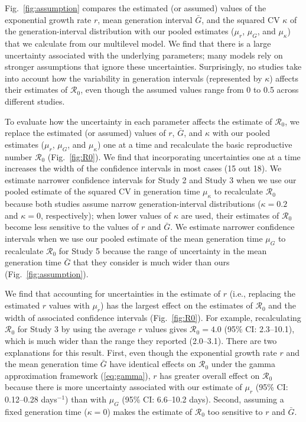 \documentclass[12pt]{article}
\newcommand{\eref}[1]{(\ref{eq:#1})}
\newcommand{\fref}[1]{Fig.~\ref{fig:#1}}
\begin{document}
\fref{assumption} compares the estimated (or assumed) values of the exponential growth rate $r$, mean generation interval $\bar G$, and the squared CV $\kappa$ of the generation-interval distribution with our pooled estimates ($\mu_r$, $\mu_G$, and $\mu_\kappa$) that we calculate from our multilevel model.
We find that there is a large uncertainty associated with the underlying parameters;
many models rely on stronger assumptions that ignore these uncertainties.
Surprisingly, no studies take into account how the variability in generation intervals (represented by $\kappa$) affects their estimates of $\mathcal R_0$, even though the assumed values range from 0 to 0.5 across different studies.

To evaluate how the uncertainty in each parameter affects the estimate of $\mathcal R_0$,
we replace the estimated (or assumed) values of $r$, $\bar G$, and $\kappa$ with our pooled estimates ($\mu_r$, $\mu_G$, and $\mu_\kappa$) one at a time and recalculate the basic reproductive number $\mathcal R_0$ (\fref{R0}).
We find that incorporating uncertainties one at a time increases the width of the confidence intervals in most cases (15 out 18).
We estimate narrower confidence intervals for Study 2 and Study 3 when we use our pooled estimate of the squared CV in generation time $\mu_\kappa$ to recalculate $\mathcal R_0$ because both studies assume narrow generation-interval distributions ($\kappa = 0.2$ and $\kappa=0$, respectively);
when lower values of $\kappa$ are used, their estimates of $\mathcal R_0$ become less sensitive to the values of $r$ and $\bar G$.
We estimate narrower confidence intervals when we use our pooled estimate of the mean generation time $\mu_G$ to recalculate $\mathcal R_0$ for Study 5 because the range of uncertainty in the mean generation time $\bar G$ that they consider is much wider than ours (\fref{assumption}).

We find that accounting for uncertainties in the estimate of $r$ (i.e., replacing the estimated $r$ values with $\mu_r$) has the largest effect on the estimates of $\mathcal R_0$ and the width of associated confidence intervals (\fref{R0}).
For example, recalculating $\mathcal R_0$ for Study 3 by using the average $r$ values gives $\mathcal R_0 = 4.0$ (95\% CI: 2.3--10.1), which is much wider than the range they reported (2.0--3.1).
There are two explanations for this result.
First, even though the exponential growth rate $r$ and the mean generation time $\bar G$ have identical effects on $\mathcal R_0$ under the gamma approximation framework \eref{gamma},
$r$ has greater overall effect on $\mathcal R_0$ because there is more uncertainty associated with our estimate of $\mu_r$ (95\% CI: 0.12--0.28 days$^{-1}$) than with $\mu_G$ (95\% CI: 6.6--10.2 days).
Second, assuming a fixed generation time ($\kappa=0$) makes the estimate of $\mathcal R_0$ too sensitive to $r$ and $\bar G$.
\end{document}
